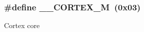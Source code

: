 \subsubsection[{\texorpdfstring{\+\_\+\+\_\+\+C\+O\+R\+T\+E\+X\+\_\+M}{__CORTEX_M}}]{\setlength{\rightskip}{0pt plus 5cm}\#define \+\_\+\+\_\+\+C\+O\+R\+T\+E\+X\+\_\+M~(0x03)}\hypertarget{group__CMSIS__CM3__core__definitions_ga63ea62503c88acab19fcf3d5743009e3}{}\label{group__CMSIS__CM3__core__definitions_ga63ea62503c88acab19fcf3d5743009e3}
Cortex core 
